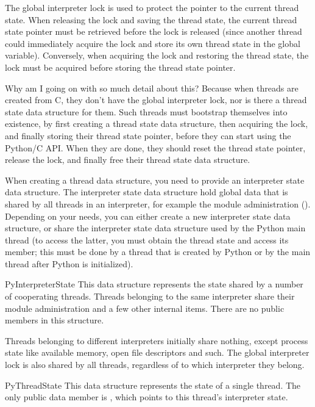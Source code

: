 The global interpreter lock is used to protect the pointer to the
current thread state.  When releasing the lock and saving the thread
state, the current thread state pointer must be retrieved before the
lock is released (since another thread could immediately acquire the
lock and store its own thread state in the global variable).
Conversely, when acquiring the lock and restoring the thread state,
the lock must be acquired before storing the thread state pointer.

Why am I going on with so much detail about this?  Because when
threads are created from C, they don't have the global interpreter
lock, nor is there a thread state data structure for them.  Such
threads must bootstrap themselves into existence, by first creating a
thread state data structure, then acquiring the lock, and finally
storing their thread state pointer, before they can start using the
Python/C API.  When they are done, they should reset the thread state
pointer, release the lock, and finally free their thread state data
structure.

When creating a thread data structure, you need to provide an
interpreter state data structure.  The interpreter state data
structure hold global data that is shared by all threads in an
interpreter, for example the module administration
().  Depending on your needs, you can either create
a new interpreter state data structure, or share the interpreter state
data structure used by the Python main thread (to access the latter,
you must obtain the thread state and access its  member;
this must be done by a thread that is created by Python or by the main
thread after Python is initialized).


\begin{ctypedesc}{PyInterpreterState}
  This data structure represents the state shared by a number of
  cooperating threads.  Threads belonging to the same interpreter
  share their module administration and a few other internal items.
  There are no public members in this structure.

  Threads belonging to different interpreters initially share nothing,
  except process state like available memory, open file descriptors
  and such.  The global interpreter lock is also shared by all
  threads, regardless of to which interpreter they belong.
\end{ctypedesc}

\begin{ctypedesc}{PyThreadState}
  This data structure represents the state of a single thread.  The
  only public data member is , which points to this thread's interpreter state.
\end{ctypedesc}

